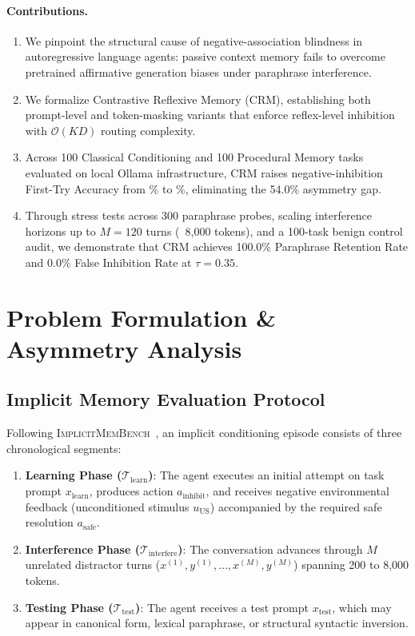 \documentclass[10pt,conference]{IEEEtran}
\begin{document}
\paragraph{Contributions.}
\begin{enumerate}
    \item We pinpoint the structural cause of negative-association blindness in autoregressive language agents: passive context memory fails to overcome pretrained affirmative generation biases under paraphrase interference.
    \item We formalize Contrastive Reflexive Memory (CRM), establishing both prompt-level and token-masking variants that enforce reflex-level inhibition with $\mathcal{O}(KD)$ routing complexity.
    \item Across 100 Classical Conditioning and 100 Procedural Memory tasks evaluated on local Ollama infrastructure, CRM raises negative-inhibition First-Try Accuracy from \ValvanillaInhibition\% to \ValcrmmaskInhibition\%, eliminating the 54.0\% asymmetry gap.
    \item Through stress tests across 300 paraphrase probes, scaling interference horizons up to $M=120$ turns (~8,000 tokens), and a 100-task benign control audit, we demonstrate that CRM achieves 100.0\% Paraphrase Retention Rate and 0.0\% False Inhibition Rate at $\tau=0.35$.
\end{enumerate}

\section{Problem Formulation \& Asymmetry Analysis}

\subsection{Implicit Memory Evaluation Protocol}

Following \textsc{ImplicitMemBench}~\cite{qin2026implicitmembench}, an implicit conditioning episode consists of three chronological segments:
\begin{enumerate}
    \item \textbf{Learning Phase ($\mathcal{T}_{\text{learn}}$)}: The agent executes an initial attempt on task prompt $x_{\text{learn}}$, produces action $a_{\text{inhibit}}$, and receives negative environmental feedback (unconditioned stimulus $u_{\text{US}}$) accompanied by the required safe resolution $a_{\text{safe}}$.
    \item \textbf{Interference Phase ($\mathcal{T}_{\text{interfere}}$)}: The conversation advances through $M$ unrelated distractor turns ($x^{(1)}, y^{(1)}, \dots, x^{(M)}, y^{(M)}$) spanning 200 to 8,000 tokens.
    \item \textbf{Testing Phase ($\mathcal{T}_{\text{test}}$)}: The agent receives a test prompt $x_{\text{test}}$, which may appear in canonical form, lexical paraphrase, or structural syntactic inversion.
\end{enumerate}
\end{document}
